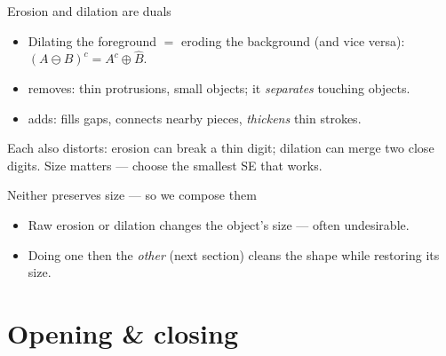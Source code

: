 \documentclass[10pt,aspectratio=169]{beamer}
\begin{document}
\begin{frame}{Erosion and dilation are duals}
  \begin{itemize}
    \item Dilating the foreground $=$ eroding the background (and vice versa): $(A \ominus B)^c = A^c \oplus \hat{B}$.
    \item {} removes: thin protrusions, small objects; it \emph{separates} touching objects.
    \item {} adds: fills gaps, connects nearby pieces, \emph{thickens} thin strokes.
  \end{itemize}
  \begin{badbox}
    Each also distorts: erosion can break a thin digit; dilation can merge two close digits. Size matters — choose the smallest SE that works.
  \end{badbox}
\end{frame}

\begin{frame}{Neither preserves size — so we compose them}
  \begin{center}
  \end{center}
  \begin{itemize}
    \item Raw erosion or dilation changes the object's size — often undesirable.
    \item Doing one then the \emph{other} (next section) cleans the shape while restoring its size.
  \end{itemize}
\end{frame}

\section{Opening \& closing}
\end{document}
